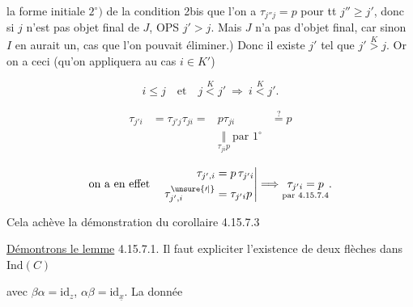 %
%
la forme initiale $2^\circ)$ de la condition 2bis que l'on a $\tau_{j''j}=p$ pour tt $j''\geq j'$, donc si $j$ n'est pas objet final de $J$, OPS $j'>j$. Mais $J$ n'a pas d'objet final, car sinon $I$ en aurait un, cas que l'on pouvait éliminer.) Donc il existe $j'$ tel que $j'\overset K>j$. Or on a ceci (qu'on appliquera au cas $i\in K'$)

\[i\leq j\quad\text{et}\quad j\overset K<j'\ \Longrightarrow\ i\overset K<j'.\]


\[\begin{aligned}\tau_{j'i}&=\tau_{j'j}\tau_{ji}={}&p\tau_{ji}&\overset{?}{=}p\\ &&\underset{\tau_{ji}p}{\Vert}\ \text{par }1^\circ\end{aligned}\]

\[\text{on a en effet}\quad\left.\begin{aligned}\tau_{j',i}&=p\,\tau_{j'i}\\ \tau^{\unsure{\prime|{}}}_{j',i}&=\tau_{j'i}p\end{aligned}\right|\Longrightarrow\underset{\text{par }4.15.7.4}{\tau_{j'i}=p}.\]

Cela achève la démonstration du corollaire 4.15.7.3


\uline{Démontrons le lemme} 4.15.7.1. Il faut expliciter l'existence de deux flèches dans $\mathrm{Ind}(C)$


avec $\beta\alpha=\mathrm{id}_z$, $\alpha\beta=\mathrm{id}_{\underline{x}}$.  La donnée
